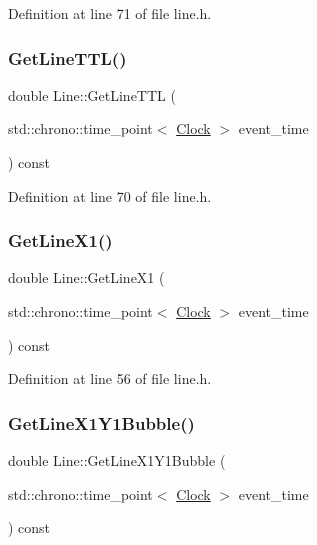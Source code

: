 Definition at line 71 of file line.\+h.

\mbox{\label{class_line_a5b9419146093908e5c7d740ac384fe39}} 
\subsubsection{\texorpdfstring{Get\+Line\+T\+T\+L()}{GetLineTTL()}}
{\footnotesize\ttfamily double Line\+::\+Get\+Line\+T\+TL (\begin{DoxyParamCaption}\item[{std\+::chrono\+::time\+\_\+point$<$ \hyperlink{universe_8h_a0ef8d951d1ca5ab3cfaf7ab4c7a6fd80}{Clock} $>$}]{event\+\_\+time }\end{DoxyParamCaption}) const\hspace{0.3cm}{\ttfamily [inline]}}



Definition at line 70 of file line.\+h.

\mbox{\label{class_line_ab14245ec4348e925b6e0f860e9254308}} 
\subsubsection{\texorpdfstring{Get\+Line\+X1()}{GetLineX1()}}
{\footnotesize\ttfamily double Line\+::\+Get\+Line\+X1 (\begin{DoxyParamCaption}\item[{std\+::chrono\+::time\+\_\+point$<$ \hyperlink{universe_8h_a0ef8d951d1ca5ab3cfaf7ab4c7a6fd80}{Clock} $>$}]{event\+\_\+time }\end{DoxyParamCaption}) const\hspace{0.3cm}{\ttfamily [inline]}}



Definition at line 56 of file line.\+h.

\mbox{\label{class_line_adc3c6c42d1b3d172e32fad59db2e3eaa}} 
\subsubsection{\texorpdfstring{Get\+Line\+X1\+Y1\+Bubble()}{GetLineX1Y1Bubble()}}
{\footnotesize\ttfamily double Line\+::\+Get\+Line\+X1\+Y1\+Bubble (\begin{DoxyParamCaption}\item[{std\+::chrono\+::time\+\_\+point$<$ \hyperlink{universe_8h_a0ef8d951d1ca5ab3cfaf7ab4c7a6fd80}{Clock} $>$}]{event\+\_\+time }\end{DoxyParamCaption}) const\hspace{0.3cm}{\ttfamily [inline]}}



